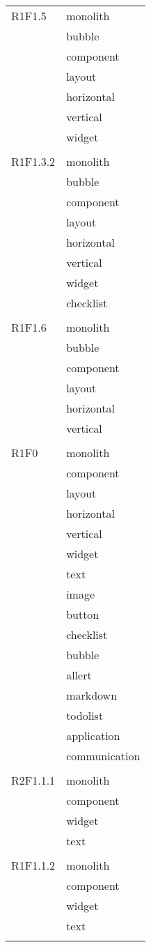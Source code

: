 \begin{center}
\begin{longtable}{|p{7cm}|p{5cm}|}
		R1F1.5 & monolith \\ & bubble \\ & component \\ & layout \\ & horizontal \\ & vertical \\ & widget \\ & \\ \hline
		R1F1.3.2 & monolith \\ & bubble \\ & component \\ & layout \\ & horizontal \\ & vertical \\ & widget \\ & checklist \\ & \\ \hline
		R1F1.6 & monolith \\ & bubble \\ & component \\ & layout \\ & horizontal \\ & vertical \\ & \\ \hline
		R1F0 & monolith \\ & component \\ & layout \\ & horizontal \\ & vertical \\ & widget \\ & text \\ & image \\ & button \\ & checklist \\ & bubble \\ & allert \\ & markdown \\ & todolist \\ & application \\ & communication \\ & \\ \hline
		R2F1.1.1 & monolith \\ & component \\ & widget \\ & text \\ & \\ \hline
		R1F1.1.2 & monolith \\ & component \\ & widget \\ & text \\ & \\ \hline

\end{longtable}
\end{center}

